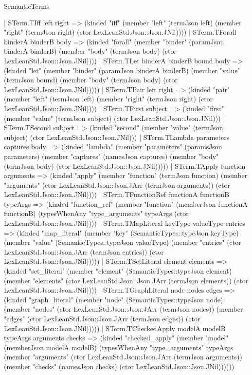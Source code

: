 \begin{lexlean}{SemanticTerms}
\begin{semanticmodule}
{    | STerm.TIff left right => (kinded "iff" (member "left" (termJson left) (member "right" (termJson right) (ctor LexLeanStd.Json::Json.JNil))))
    | STerm.TForall binderA binderB body => (kinded "forall" (member "binder" (paramJson binderA binderB) (member "body" (termJson body) (ctor LexLeanStd.Json::Json.JNil))))
    | STerm.TLet binderA binderB bound body => (kinded "let" (member "binder" (paramJson binderA binderB) (member "value" (termJson bound) (member "body" (termJson body) (ctor LexLeanStd.Json::Json.JNil)))))
    | STerm.TPair left right => (kinded "pair" (member "left" (termJson left) (member "right" (termJson right) (ctor LexLeanStd.Json::Json.JNil))))
    | STerm.TFirst subject => (kinded "first" (member "value" (termJson subject) (ctor LexLeanStd.Json::Json.JNil)))
    | STerm.TSecond subject => (kinded "second" (member "value" (termJson subject) (ctor LexLeanStd.Json::Json.JNil)))
    | STerm.TLambda parameters captures body => (kinded "lambda" (member "parameters" (paramsJson parameters) (member "captures" (namesJson captures) (member "body" (termJson body) (ctor LexLeanStd.Json::Json.JNil)))))
    | STerm.TApply function arguments => (kinded "apply" (member "function" (termJson function) (member "arguments" (ctor LexLeanStd.Json::Json.JArr (termJson arguments)) (ctor LexLeanStd.Json::Json.JNil))))
    | STerm.TFunctionRef functionA functionB typeArgs => (kinded "function_ref" (member "function" (memberJson functionA functionB) (typesWhenAny "type_arguments" typeArgs (ctor LexLeanStd.Json::Json.JNil))))
    | STerm.TMapLiteral keyType valueType entries => (kinded "map_literal" (member "key" (SemanticTypes::typeJson keyType) (member "value" (SemanticTypes::typeJson valueType) (member "entries" (ctor LexLeanStd.Json::Json.JArr (termJson entries)) (ctor LexLeanStd.Json::Json.JNil)))))
    | STerm.TSetLiteral element elements => (kinded "set_literal" (member "element" (SemanticTypes::typeJson element) (member "elements" (ctor LexLeanStd.Json::Json.JArr (termJson elements)) (ctor LexLeanStd.Json::Json.JNil))))
    | STerm.TGraphLiteral node nodes edges => (kinded "graph_literal" (member "node" (SemanticTypes::typeJson node) (member "nodes" (ctor LexLeanStd.Json::Json.JArr (termJson nodes)) (member "edges" (ctor LexLeanStd.Json::Json.JArr (termJson edges)) (ctor LexLeanStd.Json::Json.JNil)))))
    | STerm.TCheckedApply modelA modelB typeArgs arguments checks => (kinded "checked_apply" (member "model" (memberJson modelA modelB) (typesWhenAny "type_arguments" typeArgs (member "arguments" (ctor LexLeanStd.Json::Json.JArr (termJson arguments)) (member "checks" (namesJson checks) (ctor LexLeanStd.Json::Json.JNil))))))
}
\end{semanticmodule}
\end{lexlean}
